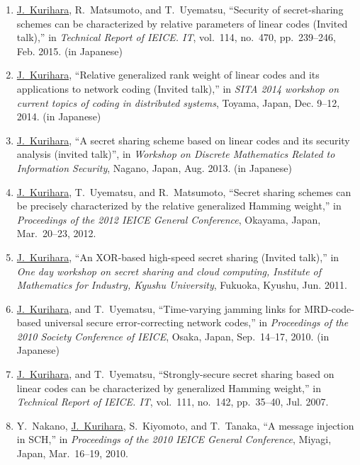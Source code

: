 \begin{enumerate}
 \item \underline{J.~Kurihara}, R.~Matsumoto, and T.~Uyematsu, ``Security of secret-sharing schemes can be characterized by relative parameters of linear codes (Invited talk),'' in \textit{Technical Report of IEICE. IT}, vol.~114, no.~470, pp.~239--246, Feb. 2015. (in Japanese)
 \item \underline{J.~Kurihara}, ``Relative generalized rank weight of linear codes and its applications to network coding (Invited talk),'' in \textit{SITA 2014 workshop on current topics of coding in distributed systems}, Toyama, Japan, Dec. 9--12, 2014. (in Japanese)
 \item \underline{J.~Kurihara}, ``A secret sharing scheme based on linear codes and its security analysis (invited talk)'', in \textit{Workshop on Discrete Mathematics Related to Information Security}, Nagano, Japan, Aug. 2013. (in Japanese)
 \item \underline{J.~Kurihara}, T.~Uyematsu, and R.~Matsumoto,
       ``Secret sharing schemes can be precisely
       characterized by the relative generalized Hamming weight,''
       in \textit{Proceedings of the 2012 IEICE General Conference},
       Okayama, Japan, Mar.~20--23, 2012.
 \item \underline{J.~Kurihara}, ``An XOR-based high-speed secret sharing (Invited talk),'' in \textit{One day workshop on secret sharing and cloud computing, Institute of Mathematics for Industry, Kyushu University}, Fukuoka, Kyushu, Jun. 2011.
 \item \underline{J.~Kurihara}, and T.~Uyematsu, ``Time-varying jamming links for MRD-code-based universal secure error-correcting network codes,'' in \textit{Proceedings of the 2010 Society Conference of IEICE}, Osaka, Japan, Sep.~14--17, 2010. (in Japanese)
 \item \underline{J.~Kurihara}, and T.~Uyematsu, ``Strongly-secure secret
       sharing based on linear codes can be characterized by generalized
       Hamming weight,'' in \textit{Technical Report of IEICE. IT},
       vol.~111, no.~142, pp.~35--40, Jul. 2007.
 \item Y.~Nakano, \underline{J.~Kurihara}, S.~Kiyomoto, and T.~Tanaka, ``A message injection in SCH,'' in \textit{Proceedings of the 2010 IEICE General Conference}, Miyagi, Japan, Mar.~16--19, 2010.


\end{enumerate}

